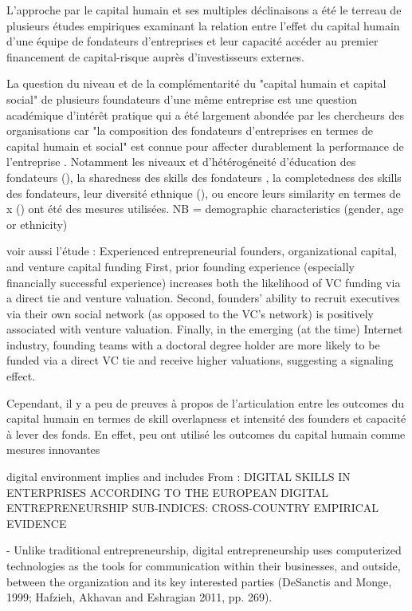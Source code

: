 \documentclass[12pt]{article}
\begin{document}
L'approche par le capital humain et ses multiples déclinaisons a été le terreau de plusieurs études empiriques examinant la relation entre l'effet du capital humain d'une équipe de fondateurs d'entreprises et leur capacité accéder au premier financement de capital-risque auprès d'investisseurs externes.

La question du niveau et de la complémentarité du "capital humain et capital social" de plusieurs foundateurs d'une même entreprise est une question académique d'intérêt pratique qui a été largement abondée par les chercheurs des organisations car "la composition des fondateurs d'entreprises en termes de capital humain et social" est connue pour affecter durablement la performance de l'entreprise \citet{colombo2005founders, unger2011human}. Notamment les niveaux et d'hétérogéneité d'éducation des fondateurs (\citet{pinelli2020too}), la sharedness des skills des fondateurs \citet{reese2020should}, la completedness des skills des fondateurs, leur diversité ethnique (\citet{wise2022startup}), ou encore leurs similarity en termes de x (\citet{singhal2022data}) ont été des mesures utilisées. NB = demographic characteristics (gender, age or ethnicity)

voir aussi l'étude : Experienced entrepreneurial founders, organizational capital, and venture capital funding
First, prior founding experience (especially financially successful experience) increases both the likelihood of VC funding via a direct tie and venture valuation. Second, founders’ ability to recruit executives via their own social network (as opposed to the VC’s network) is positively associated with venture valuation. Finally, in the emerging (at the time) Internet industry, founding teams with a doctoral degree holder are more likely to be funded via a direct VC tie and receive higher valuations, suggesting a signaling effect.

Cependant, il y a peu de preuves à propos de l'articulation entre les outcomes du capital humain en termes de skill overlapness et intensité des founders et capacité à lever des fonds. En effet, peu ont utilisé les outcomes du capital humain comme mesures innovantes \citep{marvel2016human}

digital environment implies and includes
From : DIGITAL SKILLS IN ENTERPRISES ACCORDING TO THE EUROPEAN DIGITAL ENTREPRENEURSHIP SUB-INDICES: CROSS-COUNTRY EMPIRICAL EVIDENCE

- Unlike traditional entrepreneurship, digital entrepreneurship uses computerized technologies as the tools for communication within their businesses, and outside, between the organization and its key interested parties (DeSanctis and Monge, 1999; Hafzieh, Akhavan and Eshragian 2011, pp. 269).
\end{document}
